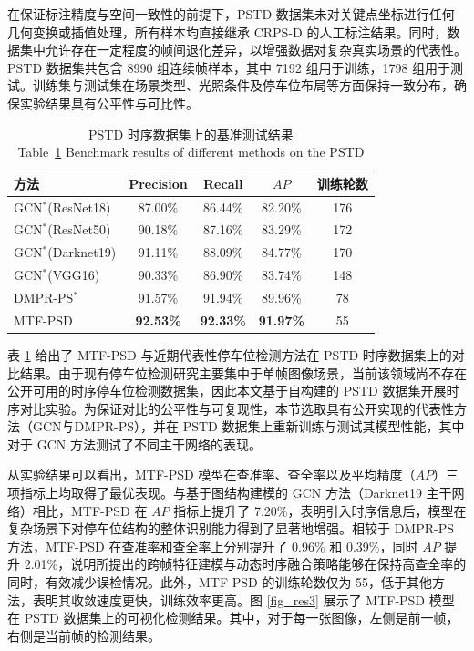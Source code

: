 在保证标注精度与空间一致性的前提下，PSTD 数据集未对关键点坐标进行任何几何变换或插值处理，所有样本均直接继承 CRPS-D 的人工标注结果。同时，数据集中允许存在一定程度的帧间退化差异，以增强数据对复杂真实场景的代表性。
PSTD 数据集共包含 8990 组连续帧样本，其中 7192 组用于训练，1798 组用于测试。训练集与测试集在场景类型、光照条件及停车位布局等方面保持一致分布，确保实验结果具有公平性与可比性。


\begin{table}[!b]
\centering
\setlength{\tabcolsep}{5mm}
\caption{PSTD 时序数据集上的基准测试结果\\
Table~\ref{tab_pstc} Benchmark results of different methods on the PSTD}
\begin{tabular}{lcccc}
\toprule
    方法 &  Precision & Recall &  $AP$ & 训练轮数\\
\midrule
       GCN$^{*}$(ResNet18)\cite{min2021attentional}  &  87.00\%	& 86.44\%	& 82.20\% & 176 \\
        GCN$^{*}$(ResNet50)\cite{min2021attentional}  &  90.18\%	& 87.16\%	& 83.29\%  & 172 \\
        GCN$^{*}$(Darknet19)\cite{min2021attentional}   & 91.11\%	& 88.09\%	& 84.77\%  & 170 \\
        GCN$^{*}$(VGG16)\cite{min2021attentional}    & 90.33\%	& 86.90\%	& 83.74\%  & 148 \\
       DMPR-PS$^{*}$\cite{huang2019dmpr} &  91.57\%	& 91.94\%	& 89.96\% & 78 \\
       MTF-PSD &   \textbf{92.53\%} & \textbf{92.33\%} & \textbf{91.97\%} & 55 \\
\bottomrule
\end{tabular}
\label{tab_pstc}
\end{table}

表 \ref{tab_pstc} 给出了 MTF-PSD 与近期代表性停车位检测方法在 PSTD 时序数据集上的对比结果。由于现有停车位检测研究主要集中于单帧图像场景，当前该领域尚不存在公开可用的时序停车位检测数据集，因此本文基于自构建的 PSTD 数据集开展时序对比实验。为保证对比的公平性与可复现性，本节选取具有公开实现的代表性方法（GCN\cite{min2021attentional}与DMPR-PS\cite{huang2019dmpr}），并在 PSTD 数据集上重新训练与测试其模型性能，其中 对于 GCN 方法测试了不同主干网络的表现。

从实验结果可以看出，MTF-PSD 模型在查准率、查全率以及平均精度（$AP$）三项指标上均取得了最优表现。与基于图结构建模的 GCN 方法（Darknet19 主干网络）相比，MTF-PSD 在 $AP$ 指标上提升了 7.20\%，表明引入时序信息后，模型在复杂场景下对停车位结构的整体识别能力得到了显著地增强。相较于 DMPR-PS 方法，MTF-PSD 在查准率和查全率上分别提升了 0.96\% 和 0.39\%，同时 $AP$ 提升 2.01\%，说明所提出的跨帧特征建模与动态时序融合策略能够在保持高查全率的同时，有效减少误检情况。此外，MTF-PSD 的训练轮数仅为 55，低于其他方法，表明其收敛速度更快，训练效率更高。图 \ref{fig_res3} 展示了 MTF-PSD 模型在 PSTD 数据集上的可视化检测结果。其中，对于每一张图像，左侧是前一帧，右侧是当前帧的检测结果。

